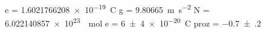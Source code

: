 e = \SI[]{1.6021766208e-19}{\coulomb}
g = \SI[]{9.80665}{\meter\per\second\squared}
N = \SI[]{6.022140857e+23}{\per\mole}
e = \SI{+6(4)e-20}{\coulomb}
proz = \SI{-0.7(2)}{}
